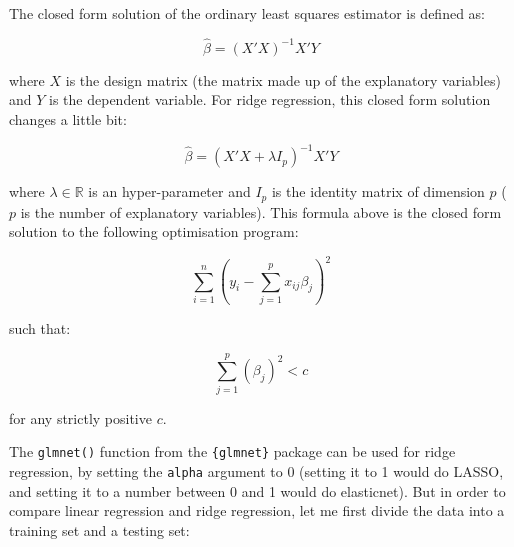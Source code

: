 \documentclass[]{gitbook}
\newenvironment{Shaded}{\begin{snugshade}}{\end{snugshade}}
\newcommand{\DataTypeTok}[1]{\textcolor[rgb]{0.13,0.29,0.53}{#1}}
\newcommand{\DecValTok}[1]{\textcolor[rgb]{0.00,0.00,0.81}{#1}}
\newcommand{\FloatTok}[1]{\textcolor[rgb]{0.00,0.00,0.81}{#1}}
\newcommand{\KeywordTok}[1]{\textcolor[rgb]{0.13,0.29,0.53}{\textbf{#1}}}
\newcommand{\NormalTok}[1]{#1}
\newcommand{\OperatorTok}[1]{\textcolor[rgb]{0.81,0.36,0.00}{\textbf{#1}}}
\newcommand{\OtherTok}[1]{\textcolor[rgb]{0.56,0.35,0.01}{#1}}
\newcommand{\StringTok}[1]{\textcolor[rgb]{0.31,0.60,0.02}{#1}}
\begin{document}
The closed form solution of the ordinary least squares estimator is defined as:

\[
\widehat{\beta} = (X'X)^{-1}X'Y
\]

where \(X\) is the design matrix (the matrix made up of the explanatory variables) and \(Y\) is the
dependent variable. For ridge regression, this closed form solution changes a little bit:

\[
\widehat{\beta} = (X'X + \lambda I_p)^{-1}X'Y
\]

where \(\lambda \in \mathbb{R}\) is an hyper-parameter and \(I_p\) is the identity matrix of dimension \(p\)
(\(p\) is the number of explanatory variables).
This formula above is the closed form solution to the following optimisation program:

\[
\sum_{i=1}^n \left(y_i - \sum_{j=1}^px_{ij}\beta_j\right)^2 
\]

such that:

\[
\sum_{j=1}^p(\beta_j)^2 < c
\]

for any strictly positive \(c\).

The \texttt{glmnet()} function from the \texttt{\{glmnet\}} package can be used for ridge regression, by setting
the \texttt{alpha} argument to 0 (setting it to 1 would do LASSO, and setting it to a number between
0 and 1 would do elasticnet). But in order to compare linear regression and ridge regression,
let me first divide the data into a training set and a testing set:

\begin{Shaded}
\end{Shaded}
\end{document}
